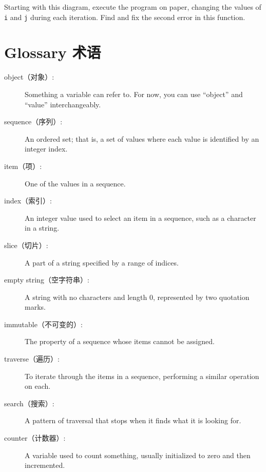 \documentclass[10pt]{book}
\begin{document}
\begin{CJK}{UTF8}{gbsn}
\begin{exercise}
\label{isreverse}

Starting with this diagram, execute the program on paper, changing the
values of {\tt i} and {\tt j} during each iteration.  Find and fix the
second error in this function.

\end{exercise}



\section{Glossary 术语}

\begin{description}

\item[object（对象）:] Something a variable can refer to.  For now,
you can use ``object'' and ``value'' interchangeably.

\item[sequence（序列）:] An ordered set; that is, a set of
values where each value is identified by an integer index.

\item[item（项）:] One of the values in a sequence.

\item[index（索引）:] An integer value used to select an item in
a sequence, such as a character in a string.

\item[slice（切片）:] A part of a string specified by a range of indices.

\item[empty string（空字符串）:] A string with no characters and length 0, represented
by two quotation marks.

\item[immutable（不可变的）:] The property of a sequence whose items cannot
be assigned.

\item[traverse（遍历）:] To iterate through the items in a sequence,
performing a similar operation on each.

\item[search（搜索）:] A pattern of traversal that stops
when it finds what it is looking for.

\item[counter（计数器）:] A variable used to count something, usually initialized
to zero and then incremented.


\end{description}
\end{CJK}
\end{document}
